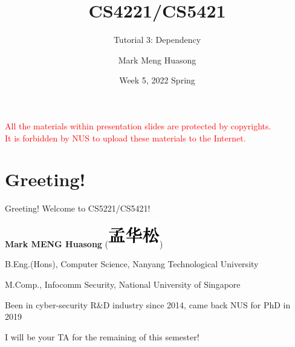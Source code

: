 \title{CS4221/CS5421}

\subtitle{Tutorial 3: Dependency}

\author{Mark Meng Huasong}



\date{Week 5, 2022 Spring}

\begin{frame}
	\titlepage
	\begin{tcolorbox}
		\begin{center}
			{\scriptsize \textcolor{red}{All the materials within presentation slides are protected by copyrights.\\
					It is forbidden by NUS to upload these materials to the Internet.}}
		\end{center}
	\end{tcolorbox}
\end{frame}

\section*{Greeting!}

\begin{frame}[fragile]{Greeting!}
	Welcome to CS5221/CS5421!\vspace{15pt}
	
	\textbf{Mark MENG Huasong} (\includegraphics[height=\fontcharht\font`\B]{t1/images/chn-chars.png}) \vspace{15pt}
	
	B.Eng.(Hons), Computer Science, Nanyang Technological University
	
	M.Comp., Infocomm Security, National University of Singapore\vspace{15pt}
	
	Been in cyber-security R\&D industry since 2014, came back NUS for PhD in 2019\vspace{15pt}
	
	I will be your TA for the remaining of this semester!
\end{frame}

